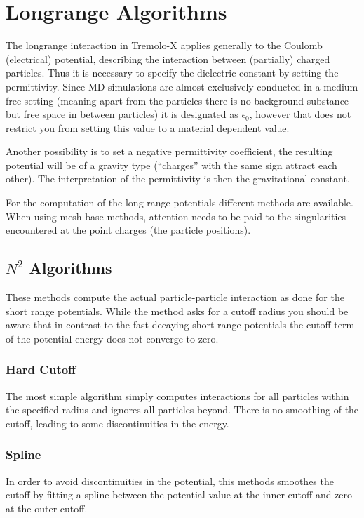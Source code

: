 \chapter{Longrange Algorithms}
\label{longrange}

The longrange interaction in Tremolo-X applies generally to the Coulomb (electrical) potential, describing the interaction between (partially) charged particles. 
Thus it is necessary to specify the dielectric constant by setting the permittivity. 
Since MD simulations are almost exclusively conducted in a medium free setting (meaning apart from the particles there is no background substance but 
free space in between particles) it is designated as $\epsilon_0$, however that does not restrict you from setting this value to a material dependent value. 

Another possibility is to set a negative permittivity coefficient, the resulting potential will be of a gravity type (``charges'' with the same sign attract each other). The interpretation of the permittivity is then the gravitational constant.


For the computation of the long range potentials different methods are available. When using mesh-base methods, attention needs to be paid to the singularities encountered at the point charges (the particle positions).

\section{$N^2$ Algorithms}
These methods compute the actual particle-particle interaction as done for the short range potentials. While the method asks for a cutoff radius you should be aware 
that in contrast to the fast decaying short range potentials the cutoff-term of the potential energy does not converge to zero.
\subsection{Hard Cutoff}
The most simple algorithm simply computes interactions for all particles within the specified radius and ignores all particles beyond. There is no smoothing of the cutoff, 
leading to some discontinuities in the energy.
\subsection{Spline}
In order to avoid discontinuities in the potential, this methods smoothes the cutoff by fitting a spline between the potential value at the inner cutoff and zero at the outer cutoff.

